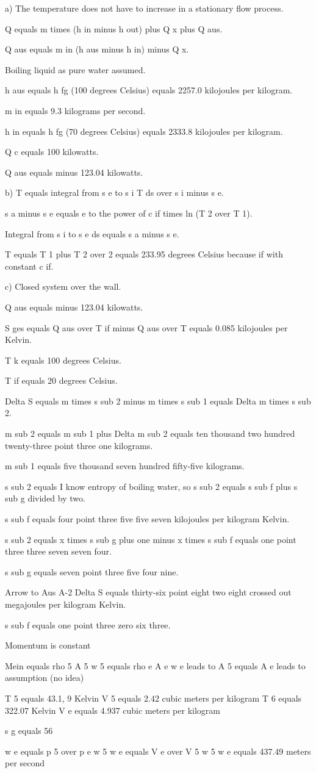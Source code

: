 a) The temperature does not have to increase in a stationary flow process.

Q equals m times (h in minus h out) plus Q x plus Q aus.

Q aus equals m in (h aus minus h in) minus Q x.

Boiling liquid as pure water assumed.

h aus equals h fg (100 degrees Celsius) equals 2257.0 kilojoules per kilogram.

m in equals 9.3 kilograms per second.

h in equals h fg (70 degrees Celsius) equals 2333.8 kilojoules per kilogram.

Q c equals 100 kilowatts.

Q aus equals minus 123.04 kilowatts.

b) T equals integral from s e to s i T ds over s i minus s e.

s a minus s e equals e to the power of c if times ln (T 2 over T 1).

Integral from s i to s e ds equals s a minus s e.

T equals T 1 plus T 2 over 2 equals 233.95 degrees Celsius because if with constant c if.

c) Closed system over the wall.

Q aus equals minus 123.04 kilowatts.

S ges equals Q aus over T if minus Q aus over T equals 0.085 kilojoules per Kelvin.

T k equals 100 degrees Celsius.

T if equals 20 degrees Celsius.

Delta S equals m times s sub 2 minus m times s sub 1 equals Delta m times s sub 2.

m sub 2 equals m sub 1 plus Delta m sub 2 equals ten thousand two hundred twenty-three point three one kilograms.

m sub 1 equals five thousand seven hundred fifty-five kilograms.

s sub 2 equals I know entropy of boiling water, so s sub 2 equals s sub f plus s sub g divided by two.

s sub f equals four point three five five seven kilojoules per kilogram Kelvin.

s sub 2 equals x times s sub g plus one minus x times s sub f equals one point three three seven seven four.

s sub g equals seven point three five four nine.

Arrow to Aus A-2 Delta S equals thirty-six point eight two eight crossed out megajoules per kilogram Kelvin.

s sub f equals one point three zero six three.

Momentum is constant

Mein equals rho 5 A 5 w 5 equals rho e A e w e leads to A 5 equals A e leads to assumption (no idea)

T 5 equals 43.1, 9 Kelvin
V 5 equals 2.42 cubic meters per kilogram
T 6 equals 322.07 Kelvin
V e equals 4.937 cubic meters per kilogram

s g equals 56

w e equals p 5 over p e w 5
w e equals V e over V 5 w 5
w e equals 437.49 meters per second